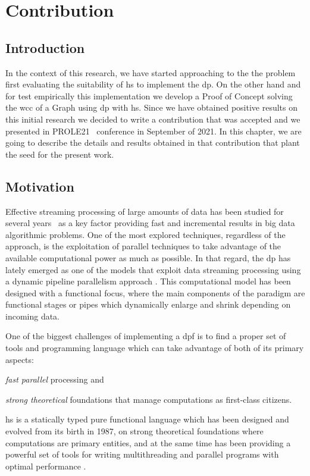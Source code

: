 \chapter{Contribution}\label{chapter:3}
\section{Introduction}
In the context of this research, we have started approaching to the the problem first evaluating the suitability of \acrlong{hs}
to implement the \acrlong{dp}. On the other hand and for test empirically this implementation we develop a Proof of Concept solving 
the \acrlong{wcc} of a Graph using \acrlong{dp} with \acrshort{hs}.
Since we have obtained positive results on this initial research we decided to write a contribution that was accepted and we presented in PROLE21~\cite{prole21} 
conference in September of 2021.
In this chapter, we are going to describe the details and results obtained in that contribution that plant the seed for the present work.

\section{Motivation}
Effective streaming processing of large amounts of data has been studied for several years~\cite{enumeratingsg, exploting, onthefly} as a key factor providing fast and incremental 
results in big data algorithmic problems. One of the most explored techniques, regardless of the approach, is the exploitation of parallel techniques to take advantage of the available 
computational power as much as possible. In that regard, the \acrfull{dp} \cite{dpdef} has lately emerged as one of the models that exploit data streaming processing using a dynamic pipeline parallelism approach \cite{onthefly}. 
This computational model has been designed with a functional focus, where the main components of the paradigm are functional stages or pipes which dynamically enlarge and shrink depending on incoming data.  

One of the biggest challenges of implementing a \acrfull{dpf} is to find a proper set of tools and programming language which can take advantage of both of its primary aspects: \begin{inparaenum}[i\upshape)]
\item  \emph{fast parallel} processing and 
\item  \emph{strong theoretical} foundations that manage computations as first-class citizens.
 \end{inparaenum}
\acrfull{hs} is a statically typed pure functional language which has been designed and evolved from its birth in 1987, on strong theoretical foundations where computations are primary entities, 
and at the same time has been providing a powerful set of tools for writing multithreading and parallel programs with optimal performance \cite{parallelbook, monadpar}.

